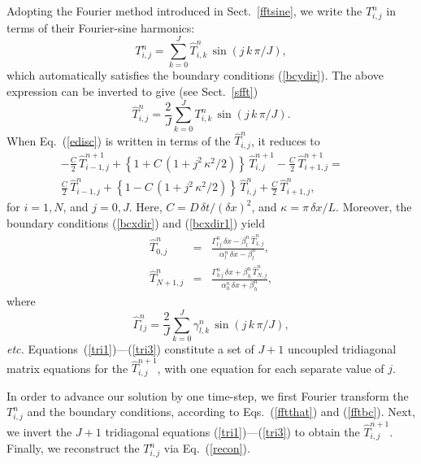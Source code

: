 Adopting the Fourier  method introduced in Sect.~\ref{fftsine}, we
write the $T_{i,j}^n$ in terms of their Fourier-sine harmonics:
\begin{equation}\label{recon}
T_{i,j}^n = \sum_{k=0}^{J} \hat{T}_{i,k}^n\,\sin(j\,k\,\pi/J),
\end{equation}
which automatically satisfies the boundary conditions (\ref{bcydir}).
The above expression can be inverted to give (see Sect.~\ref{sfft})
\begin{equation}\label{fftthat}
\hat{T}_{i,j}^n = \frac{2}{J}\sum_{k=0}^{J} T_{i,k}^n\,\sin(j\,k\,\pi/J).
\end{equation}
When Eq.~(\ref{edisc}) is written in terms of the $\hat{T}_{i,j}^n$, it reduces to
\begin{eqnarray}
-\frac{C}{2}\,\hat{T}_{i-1,j}^{n+1} + \left\{1+C\,(1+j^2\,\kappa^2/2)\right\}\,
\hat{T}_{i,j}^{n+1}-\frac{C}{2}\,\hat{T}_{i+1,j}^{n+1}
=&&\nonumber\\[0.5ex] \frac{C}{2}\,\hat{T}_{i-1,j}^{n} + \left\{1-C\,(1+j^2\,\kappa^2/2)\right\}\,
\hat{T}_{i,j}^{n}+\frac{C}{2}\,\hat{T}_{i+1,j}^{n},&&\label{tri1}
\end{eqnarray}
for $i=1,N$, and $j=0,J$. Here, $C= D\,\delta t/(\delta x)^2$, and $\kappa = \pi\,\delta x/L$.
Moreover, the boundary conditions (\ref{bcxdir}) and  (\ref{bcxdir1}) yield
\begin{eqnarray}
\hat{T}_{0,j}^n &=& \frac{\Gamma_{l\,j}^n\,\delta x-\beta_l^n\,\hat{T}_{1,j}^n}{\alpha_l^n\,\delta x -\beta_l^n},\\[0.5ex]
\hat{T}_{N+1,j}^n &=& \frac{\Gamma_{h\,j}^n\,\delta x + \beta_h^n\,\hat{T}_{N,j}^n}{\alpha_h^n\,\delta x +\beta_h^n},\label{tri3}
\end{eqnarray}
where
\begin{equation}\label{fftbc}
\hat{\Gamma}_{l\,j}^n = \frac{2}{J}\sum_{k=0}^{J} \gamma_{l,k}^n\,\sin(j\,k\,\pi/J),
\end{equation}
{\em etc.} Equations~(\ref{tri1})---(\ref{tri3}) constitute a set of $J+1$
uncoupled tridiagonal matrix equations for the $\hat{T}_{i,j}^{n+1}$, with one
equation for each separate value of $j$. 

In order to advance our solution by one time-step, we first Fourier transform the
$T_{i,j}^n$ and the boundary conditions, according to Eqs.~(\ref{fftthat}) and (\ref{fftbc}).
Next, we invert the $J+1$ tridiagonal equations (\ref{tri1})---(\ref{tri3}) to
 obtain the $\hat{T}_{i,j}^{n+1}$. Finally, we reconstruct the $T_{i,j}^n$ via
Eq.~(\ref{recon}).

